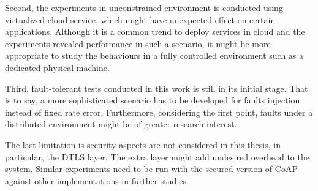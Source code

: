 Second, the experiments in unconstrained environment is conducted using virtualized cloud service, which might have unexpected effect on certain applications. Although it is a common trend to deploy services in cloud and the experiments revealed performance in such a scenario, it might be more appropriate to study the behaviours in a fully controlled environment such as a dedicated physical machine. 

Third, fault-tolerant tests conducted in this work is still in its initial stage. That is to say, a more sophisticated scenario has to be developed for faults injection instead of fixed rate error. Furthermore, considering the first point, faults under a distributed environment might be of greater research interest. 

The last limitation is security aspects are not considered in this thesis, in particular, the DTLS layer. The extra layer might add undesired overhead to the system. Similar experiments need to be run with the secured version of CoAP against other implementations in further studies.








